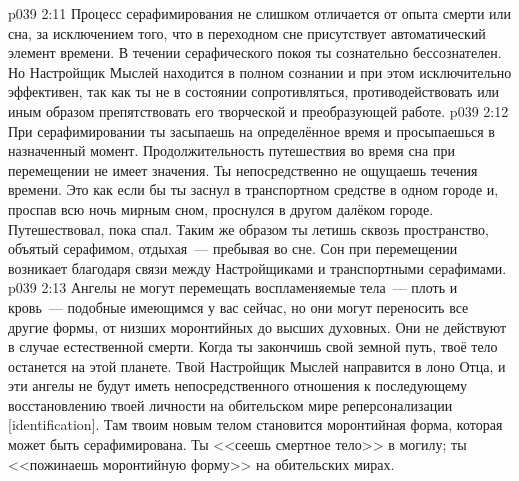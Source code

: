 \vs p039 2:11 Процесс серафимирования не слишком отличается от опыта смерти или сна, за исключением того, что в переходном сне присутствует автоматический элемент времени. В течении серафического покоя ты сознательно бессознателен. Но Настройщик Мыслей находится в полном сознании и при этом исключительно эффективен, так как ты не в состоянии сопротивляться, противодействовать или иным образом препятствовать его творческой и преобразующей работе.
\vs p039 2:12 При серафимировании ты засыпаешь на определённое время и просыпаешься в назначенный момент. Продолжительность путешествия во время сна при перемещении не имеет значения. Ты непосредственно не ощущаешь течения времени. Это как если бы ты заснул в транспортном средстве в одном городе и, проспав всю ночь мирным сном, проснулся в другом далёком городе. Путешествовал, пока спал. Таким же образом ты летишь сквозь пространство, объятый серафимом, отдыхая~--- пребывая во сне. Сон при перемещении возникает благодаря связи между Настройщиками и транспортными серафимами.
\vs p039 2:13 \pc Ангелы не могут перемещать воспламеняемые тела~--- плоть и кровь~--- подобные имеющимся у вас сейчас, но они могут переносить все другие формы, от низших моронтийных до высших духовных. Они не действуют в случае естественной смерти. Когда ты закончишь свой земной путь, твоё тело останется на этой планете. Твой Настройщик Мыслей направится в лоно Отца, и эти ангелы не будут иметь непосредственного отношения к последующему восстановлению твоей личности на обительском мире реперсонализации [identification]. Там твоим новым телом становится моронтийная форма, которая может быть серафимирована. Ты <<сеешь смертное тело>> в могилу; ты <<пожинаешь моронтийную форму>> на обительских мирах.

